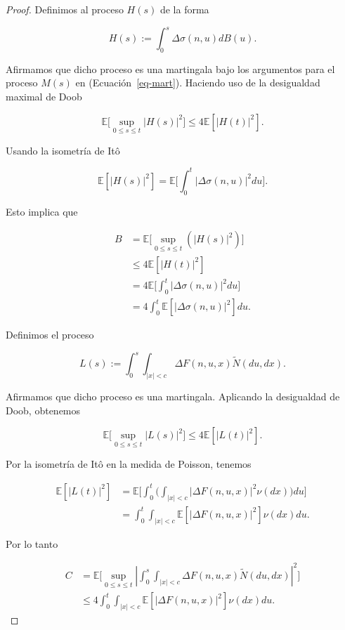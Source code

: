 \documentclass[
  spanish,
  us-letterpaper,
]{scrreprt}
\theoremstyle{plain}
\theoremstyle{plain}
\theoremstyle{definition}
\theoremstyle{plain}
\theoremstyle{remark}
\begin{document}
\begin{proof}
Definimos al proceso \(H(s)\) de la forma

\[
    H(s) := \int_0^s \Delta \sigma(n,u)dB(u).
\]

Afirmamos que dicho proceso es una martingala bajo los argumentos para
el proceso \(M(s)\) en (Ecuación~\ref{eq-mart}). Haciendo uso de la
desigualdad maximal de Doob

\[
    \mathbb{E}\Bigg[\sup\limits_{0\leq s\leq t}|H(s)|^2\Bigg]\leq 4\mathbb{E}[|H(t)|^2].
\]

Usando la isometría de Itô

\[
    \mathbb{E}[|H(s)|^2]=\mathbb{E}\Bigg[\int_0^t |\Delta \sigma(n,u)|^2 du\Bigg].
\]

Esto implica que

\[
    \begin{aligned}
        B & = \mathbb{E}\Bigg[\sup\limits_{0\leq s\leq t}\left(|H(s)|^2\right)\Bigg]\\ 
        & \leq 4\mathbb{E}[|H(t)|^2]\\ 
        & = 4 \mathbb{E}\Bigg[\int_0^t |\Delta \sigma(n,u)|^2du\Bigg]\\ 
        & = 4 \int_0^t \mathbb{E}[|\Delta \sigma(n,u)|^2]du.
    \end{aligned}
\]

Definimos el proceso

\[
    L(s) := \int_0^s\int_{|x|<c} \Delta F(n,u,x)\widetilde{N}(du,dx).
\]

Afirmamos que dicho proceso es una martingala. Aplicando la desigualdad
de Doob, obtenemos

\[
    \mathbb{E}\Bigg[\sup\limits_{0\leq s\leq t} |L(s)|^2\Bigg]\leq 4\mathbb{E}\left[|L(t)|^2\right].
\]

Por la isometría de Itô en la medida de Poisson, tenemos

\[
    \begin{aligned}
        \mathbb{E}\left[|L(t)|^2\right] & = \mathbb{E}\Bigg[\int_0^t\Bigg(\int_{|x|<c}|\Delta F(n,u,x)|^2\nu(dx)\Bigg)du\Bigg]\\ 
        & = \int_0^t\int_{|x|<c}\mathbb{E}\left[|\Delta F(n,u,x)|^2\right]\nu(dx)du.
    \end{aligned}
\]

Por lo tanto

\[
    \begin{aligned}
        C & = \mathbb{E}\Bigg[\sup\limits_{0\leq s\leq t}\left|\int_0^s\int_{|x|<c}\Delta F(n,u,x)\widetilde{N}(du,dx)\right|^2\Bigg]\\ 
        & \leq 4 \int_0^t\int_{|x|<c}\mathbb{E}\left[|\Delta F(n,u,x)|^2\right]\nu(dx)du.
    \end{aligned}
\]


\end{proof}
\end{document}
